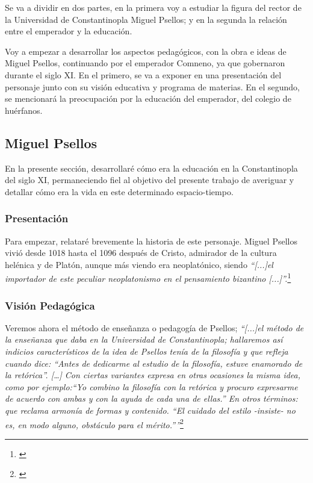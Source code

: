 

Se va a dividir en dos partes, en la primera voy a estudiar
la figura del rector de la Universidad de Constantinopla
Miguel Psellos; y en la segunda la relación entre el emperador y la
educación.

Voy a empezar a desarrollar los aspectos pedagógicos, con la obra e 
ideas de Miguel Psellos, continuando por el emperador Comneno, 
ya que gobernaron durante el siglo XI. En el primero, se va a exponer
en una presentación del personaje junto con su visión educativa y 
programa de materias. En el segundo, se mencionará la preocupación por 
la educación del emperador, del colegio de huérfanos.

\subsection{Miguel Psellos}
En la presente sección, desarrollaré cómo era la educación en la 
Constantinopla del siglo XI, permaneciendo fiel al objetivo del 
presente trabajo de averiguar y detallar cómo era la vida en este 
determinado espacio-tiempo.

\subsubsection{Presentación}
Para empezar, relataré brevemente la historia de este personaje. 
Miguel Psellos vivió desde 1018 hasta el 1096 después de Cristo, 
admirador de la cultura helénica y de Platón, aunque más viendo era 
neoplatónico, siendo \textit{“[...]el importador de este peculiar neoplatonismo 
en el pensamiento bizantino [...]”.}\footnote{\cite[p.~160]{filosofia}}

\subsubsection{Visión Pedagógica}
Veremos ahora el método de enseñanza o pedagogía de Psellos; 
\textit{“[...]el método de la enseñanza que daba en la Universidad de 
Constantinopla; hallaremos así indicios característicos de la idea de 
Psellos tenía de la filosofía y que refleja cuando dice: 
“Antes de dedicarme al estudio de la filosofía, estuve enamorado de 
la retórica”. […] Con ciertas variantes expresa en otras ocasiones 
la misma idea, como por ejemplo:“Yo combino la filosofía con la 
retórica y procuro expresarme de acuerdo con ambas y con la ayuda de 
cada una de ellas.” En otros términos: que reclama armonía de 
formas y contenido. “El cuidado del estilo -insiste- no es, 
en modo alguno, obstáculo para el mérito.””}\footnote{\cite[p.~160]{filosofia}}

